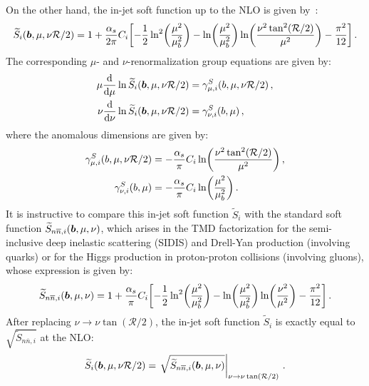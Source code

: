 \documentclass[a4paper, 11 pt]{article}
\begin{document}
On the other hand, the in-jet soft function up to the NLO is given by~\cite{Kang:2017glf, Buffing:2018ggv, Kang:2021ffh}:
\begin{equation}
\label{e.soft}
\widetilde{S}_i \pqty{\boldsymbol{b}, \mu, \nu \mathcal{R}/2}
=
1
+
\frac{\alpha _s}{2 \pi} C_i
\bqty{
- \frac{1}{2} \ln[2](\frac{\mu ^2}{\mu _b^2})
-
\ln(\frac{\mu ^2}{\mu_b^2}) \ln(\frac{\nu ^2 \tan[2](\mathcal{R}/2)}{\mu^2})
-
\frac{\pi ^2}{12}
} \, .
\end{equation}
The corresponding $\mu$- and $\nu$-renormalization group equations are given by:
\begin{align}
\mu\frac{\dd{}}{\dd{\mu}}\ln \widetilde{S}_i \pqty{\boldsymbol{b}, \mu, \nu \mathcal{R}/2}
& =
\gamma _{\mu , i}^S \pqty{b, \mu, \nu \mathcal{R}/2}
\, , \\
\nu\frac{\dd{}}{\dd{\nu}}\ln \widetilde{S}_i \pqty{\boldsymbol{b}, \mu, \nu \mathcal{R}/2}
& =
\gamma _{\nu , i}^S \pqty{b, \mu}
\, ,
\end{align}
where the anomalous dimensions are given by:
\begin{align}
\gamma _{\mu , i}^S \pqty{b, \mu, \nu \mathcal{R}/2}
& =
- \frac{\alpha _s}{\pi} C_i
\ln(\frac{\nu ^2 \tan[2](\mathcal{R}/2)}{\mu ^2})
\, , \label{e.soft_mu_gamma} \\
\gamma _{\nu , i}^S \pqty{b, \mu}
& =
- \frac{\alpha _s}{\pi} C_i
\ln(\frac{\mu ^2}{\mu _b^2})
\, . \label{e.soft_nu_gamma}
\end{align}
It is instructive to compare this in-jet soft function $\widetilde{S}_i$ with the standard soft function $\widetilde{S}_{n\overline{n},i}\pqty{\boldsymbol{b}, \mu, \nu}$, which arises in the TMD factorization for the semi-inclusive deep inelastic scattering (SIDIS) and Drell-Yan production (involving quarks) or for the Higgs production in proton-proton collisions (involving gluons), whose expression is given by:
\begin{align}
\widetilde{S}_{n \overline{n}, i} \pqty{\boldsymbol{b}, \mu, \nu} =  1
+
\frac{\alpha _s}{\pi} C_i
\bqty{
- \frac{1}{2} \ln[2](\frac{\mu ^2}{\mu _b^2})
-
\ln(\frac{\mu ^2}{\mu _b^2}) \ln(\frac{\nu ^2}{\mu^2})
-
\frac{\pi ^2}{12}
} \, . 
\end{align}
After replacing $\nu \to \nu \tan(\mathcal{R}/2)$, the in-jet soft function $\widetilde{S}_i$ is exactly equal to $\sqrt{\widetilde{S}_{n \overline{n}, i}}$ at the NLO:
\begin{align}
\widetilde{S}_i \pqty{\boldsymbol{b}, \mu, \nu \mathcal{R}/2}
= \left.\sqrt{\widetilde{S}_{n \overline{n}, i} \pqty{\boldsymbol{b}, \mu, \nu}}\right|_{\nu \to \nu\tan(\mathcal{R}/2)}
\, .
\end{align}
\end{document}
